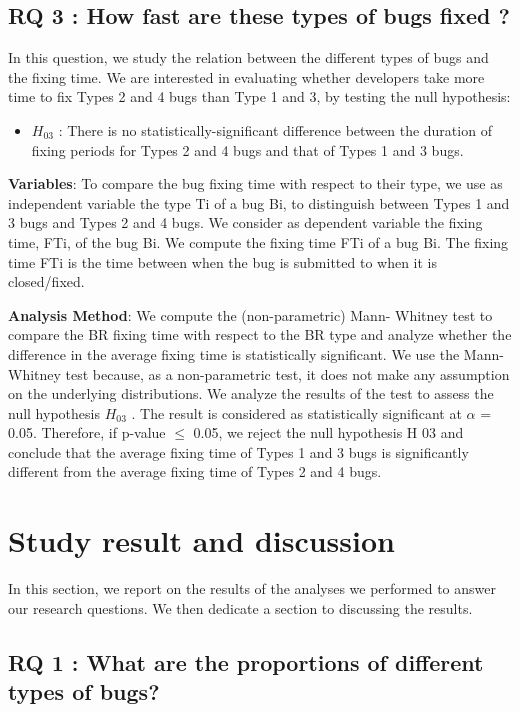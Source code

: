 \subsection{RQ 3 : How fast are these types of bugs fixed ?}

In this question, we study the relation between the
different types of bugs and the fixing time. We are interested
in evaluating whether developers take more time to fix Types
2 and 4 bugs than Type 1 and 3, by testing the null hypothesis:

\begin{itemize}
	\item $H_{03}$ : There is no statistically-significant difference
between the duration of fixing periods for Types 2 and
4 bugs and that of Types 1 and 3 bugs.
\end{itemize}


{\bf Variables}: To compare the bug fixing time with respect to
their type, we use as independent variable the type Ti of a
bug Bi, to distinguish between Types 1 and 3 bugs and Types
2 and 4 bugs. We consider as dependent variable the fixing
time, FTi, of the bug Bi. We compute the fixing time FTi of a
bug Bi. The fixing time FTi is the time between when the bug
is submitted to when it is closed/fixed.

{\bf Analysis Method}: We compute the (non-parametric) Mann-
Whitney test to compare the BR fixing time with respect to
the BR type and analyze whether the difference in the average
fixing time is statistically significant. We use the Mann-
Whitney test because, as a non-parametric test, it does not
make any assumption on the underlying distributions. We
analyze the results of the test to assess the null hypothesis
$H_{03}$ . The result is considered as statistically significant at $\alpha$ =
0.05. Therefore, if p-value $\le$ 0.05, we reject the null
hypothesis H 03 and conclude that the average fixing time of
Types 1 and 3 bugs is significantly different from the average
fixing time of Types 2 and 4 bugs.

\section{Study result and discussion}

In this section, we report on the results of the analyses we
performed to answer our research questions. We then dedicate
a section to discussing the results.

\subsection{RQ 1 : What are the proportions of different types of
bugs?}

